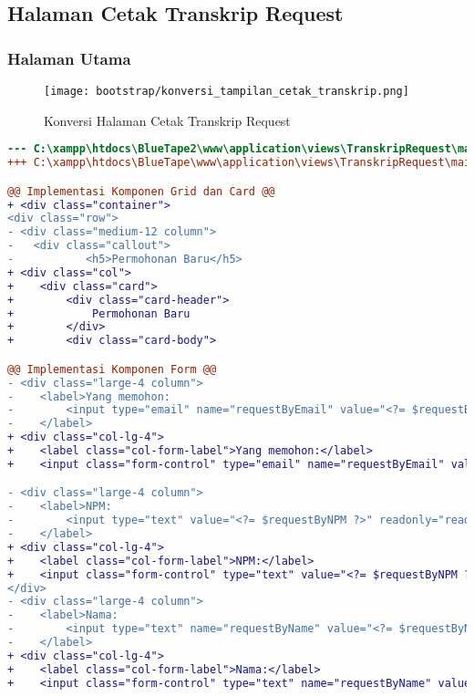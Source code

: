 \subsection{Halaman Cetak Transkrip Request}
\subsubsection{Halaman Utama}
\begin{figure} [H]
	\centering  
	\texttt{[image: bootstrap/konversi\_tampilan\_cetak\_transkrip.png]}  
	\caption{Konversi Halaman Cetak Transkrip Request} 
\end{figure}
\begin{lstlisting}[language=diff, caption=Kode untuk Halaman Cetak Transkrip Request, label=Entri, basicstyle=\ttfamily, frame=single,
columns=fullflexible, keepspaces=true, breaklines=true]
--- C:\xampp\htdocs\BlueTape2\www\application\views\TranskripRequest\main.php
+++ C:\xampp\htdocs\BlueTape\www\application\views\TranskripRequest\main.php

@@ Implementasi Komponen Grid dan Card @@
+ <div class="container">
<div class="row">
- <div class="medium-12 column">
-	<div class="callout">
-    		<h5>Permohonan Baru</h5>
+ <div class="col">
+    <div class="card">
+        <div class="card-header">
+            Permohonan Baru
+        </div>
+        <div class="card-body">

@@ Implementasi Komponen Form @@
- <div class="large-4 column">
-    <label>Yang memohon:
-        <input type="email" name="requestByEmail" value="<?= $requestByEmail ?>" readonly="readonly"/>
-    </label>
+ <div class="col-lg-4">
+    <label class="col-form-label">Yang memohon:</label>
+    <input class="form-control" type="email" name="requestByEmail" value="<?= $requestByEmail ?>" readonly/>

- <div class="large-4 column">
-    <label>NPM:
-        <input type="text" value="<?= $requestByNPM ?>" readonly="readonly"/>
-    </label>
+ <div class="col-lg-4">
+    <label class="col-form-label">NPM:</label>
+    <input class="form-control" type="text" value="<?= $requestByNPM ?>" readonly/>
</div>
- <div class="large-4 column">
-    <label>Nama:
-        <input type="text" name="requestByName" value="<?= $requestByName ?>" readonly="readonly"/>
-    </label>
+ <div class="col-lg-4">
+    <label class="col-form-label">Nama:</label>
+    <input class="form-control" type="text" name="requestByName" value="<?= $requestByName ?>" 


\end{lstlisting}
